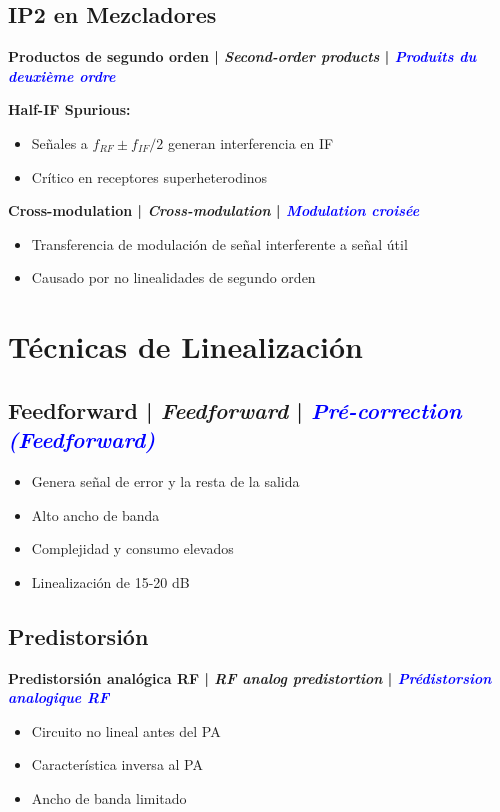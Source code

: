 \documentclass[a4paper,10pt]{article}
\begin{document}
\subsection{IP2 en Mezcladores}

\textbf{Productos de segundo orden | \textit{Second-order products} | \textcolor{blue}{\textit{Produits du deuxième ordre}}}

\textbf{Half-IF Spurious:}
\begin{itemize}[leftmargin=*]
    \item Se\~nales a $f_{RF} \pm f_{IF}/2$ generan interferencia en IF
    \item Cr\'itico en receptores superheterodinos
\end{itemize}

\textbf{Cross-modulation | \textit{Cross-modulation} | \textcolor{blue}{\textit{Modulation crois\'ee}}}
\begin{itemize}[leftmargin=*]
    \item Transferencia de modulaci\'on de se\~nal interferente a se\~nal \'util
    \item Causado por no linealidades de segundo orden
\end{itemize}

\section{Técnicas de Linealización}

\subsection{Feedforward | \textit{Feedforward} | \textcolor{blue}{\textit{Pr\'e-correction (Feedforward)}}}

\begin{itemize}[leftmargin=*]
    \item Genera se\~nal de error y la resta de la salida
    \item Alto ancho de banda
    \item Complejidad y consumo elevados
    \item Linealización de 15-20 dB
\end{itemize}

\subsection{Predistorsi\'on}

\textbf{Predistorsión analógica RF | \textit{RF analog predistortion} | \textcolor{blue}{\textit{Pr\'edistorsion analogique RF}}}
\begin{itemize}[leftmargin=*]
    \item Circuito no lineal antes del PA
    \item Caracter\'istica inversa al PA
    \item Ancho de banda limitado
\end{itemize}
\end{document}
